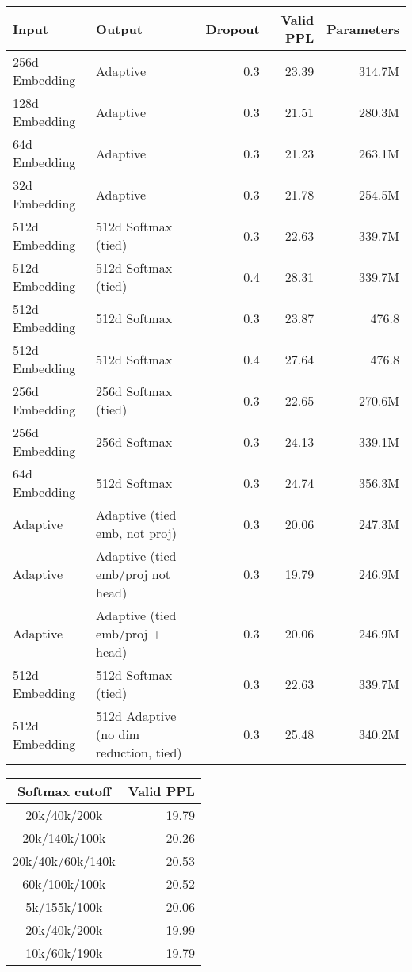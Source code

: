 \documentclass{article} \usepackage{iclr2019_conference,times}
\def\wiki{\textsc{wikitext-103}}
\begin{document}
\begin{table*}[h]
\centering
\begin{tabular}{llrrr}
\toprule
\bf Input & \bf Output & \bf Dropout & \bf Valid PPL & \bf Parameters \\ \midrule
256d Embedding & Adaptive & 0.3 & 23.39 & 314.7M \\
128d Embedding & Adaptive & 0.3 & 21.51 & 280.3M \\
64d Embedding & Adaptive & 0.3 & 21.23 & 263.1M \\
32d Embedding & Adaptive & 0.3 & 21.78 & 254.5M \\
\midrule
512d Embedding & 512d Softmax (tied) & 0.3 & 22.63 & 339.7M \\
512d Embedding & 512d Softmax (tied) & 0.4 & 28.31 & 339.7M \\
512d Embedding & 512d Softmax & 0.3 & 23.87 & 476.8 \\
512d Embedding & 512d Softmax & 0.4 & 27.64 & 476.8 \\
256d Embedding & 256d Softmax (tied) & 0.3 & 22.65 & 270.6M \\
256d Embedding & 256d Softmax & 0.3 & 24.13 & 339.1M \\
64d Embedding & 512d Softmax & 0.3 & 24.74 & 356.3M \\
\midrule
Adaptive & Adaptive (tied emb, not proj) & 0.3 & 20.06 & 247.3M \\
Adaptive & Adaptive (tied emb/proj not head) & 0.3 & 19.79 & 246.9M \\
Adaptive & Adaptive (tied emb/proj + head) & 0.3 & 20.06 & 246.9M \\
\midrule
512d Embedding & 512d Softmax (tied) & 0.3 & 22.63 & 339.7M \\
512d Embedding & 512d Adaptive (no dim reduction, tied) & 0.3 & 25.48 & 340.2M \\
\bottomrule
\end{tabular}
\caption{Validation perplexity of our models on \wiki{}.
}
\label{tab:comparable}
\end{table*}

\begin{table*}[h]
\centering
\begin{tabular}{cr}
\toprule
\bf Softmax cutoff & \bf Valid PPL
\\ 
\midrule
20k/40k/200k & 19.79 \\
20k/140k/100k & 20.26 \\
20k/40k/60k/140k & 20.53 \\
60k/100k/100k & 20.52 \\
5k/155k/100k & 20.06 \\
20k/40k/200k & 19.99 \\
10k/60k/190k & 19.79 \\
\bottomrule
\end{tabular}
\caption{Validation perplexity on \wiki{} with tied adaptive inputs \& outputs. The bands signify the number of words belonging to each band. In every case, the first band has dimension 1024, the second band 256, the third band 64 and the fourth band (if it exists) 16.}
\label{tab:cutoffs}
\end{table*}
\end{document}
